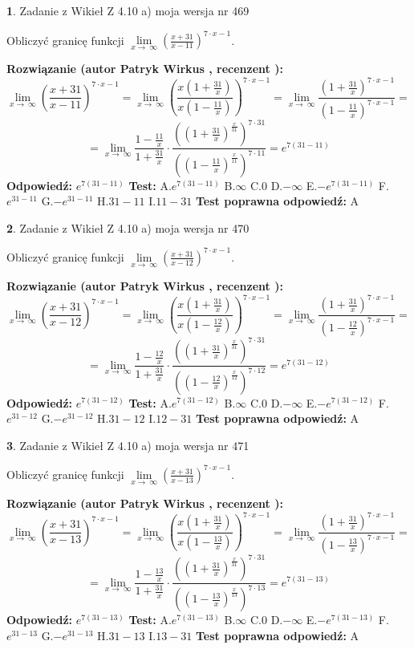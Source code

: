 \documentclass[12pt, a4paper]{article}
\theoremstyle{definition} %
\newtheorem{zad}{}
\newcommand{\zadStart}[1]{\begin{zad}#1\newline}
\newcommand{\zadStop}{\end{zad}}
\newcommand{\rozwStart}[2]{\noindent \textbf{Rozwiązanie (autor #1 , recenzent #2): }\newline}
\newcommand{\rozwStop}{\newline}
\newcommand{\odpStart}{\noindent \textbf{Odpowiedź:}\newline}
\newcommand{\odpStop}{\newline}
\newcommand{\testStart}{\noindent \textbf{Test:}\newline}
\newcommand{\testStop}{\newline}
\newcommand{\kluczStart}{\noindent \textbf{Test poprawna odpowiedź:}\newline}
\newcommand{\kluczStop}{\newline}
\begin{document}
\zadStart{Zadanie z Wikieł Z 4.10 a) moja wersja nr 469}


Obliczyć granicę funkcji  $\lim\limits_{x\to\ \infty}(\frac{x+31}{x-11})^{7\cdot x-1}$.
\zadStop
\rozwStart{Patryk Wirkus}{}
$$\lim\limits_{x\to\ \infty}(\frac{x+31}{x-11})^{7\cdot x-1} = \lim\limits_{x\to\ \infty}(\frac{x(1+\frac{31}{x})}{x(1-\frac{11}{x})})^{7\cdot x-1}=\lim\limits_{x\to\ \infty}\frac{(1+\frac{31}{x})^{7\cdot x-1}}{(1-\frac{11}{x})^{7\cdot x-1}}=$$
$$=\lim\limits_{x\to\ \infty}\frac{1-\frac{11}{x}}{1+\frac{31}{x}}\cdot\frac{((1+\frac{31}{x})^{\frac{x}{31}})^{7\cdot31}}{((1-\frac{11}{x})^{\frac{x}{11}})^{7\cdot11}}=e^{7(31-11)}$$
\rozwStop
\odpStart
$e^{7(31-11)}$
\odpStop
\testStart
A.$e^{7(31-11)}$ B.$\infty$ C.$0$ D.$-\infty$ E.$-e^{7(31-11)}$
F.$e^{31-11}$ G.$-e^{31-11}$
H.$31-11$
I.$11-31$
\testStop
\kluczStart
A
\kluczStop



\zadStart{Zadanie z Wikieł Z 4.10 a) moja wersja nr 470}


Obliczyć granicę funkcji  $\lim\limits_{x\to\ \infty}(\frac{x+31}{x-12})^{7\cdot x-1}$.
\zadStop
\rozwStart{Patryk Wirkus}{}
$$\lim\limits_{x\to\ \infty}(\frac{x+31}{x-12})^{7\cdot x-1} = \lim\limits_{x\to\ \infty}(\frac{x(1+\frac{31}{x})}{x(1-\frac{12}{x})})^{7\cdot x-1}=\lim\limits_{x\to\ \infty}\frac{(1+\frac{31}{x})^{7\cdot x-1}}{(1-\frac{12}{x})^{7\cdot x-1}}=$$
$$=\lim\limits_{x\to\ \infty}\frac{1-\frac{12}{x}}{1+\frac{31}{x}}\cdot\frac{((1+\frac{31}{x})^{\frac{x}{31}})^{7\cdot31}}{((1-\frac{12}{x})^{\frac{x}{12}})^{7\cdot12}}=e^{7(31-12)}$$
\rozwStop
\odpStart
$e^{7(31-12)}$
\odpStop
\testStart
A.$e^{7(31-12)}$ B.$\infty$ C.$0$ D.$-\infty$ E.$-e^{7(31-12)}$
F.$e^{31-12}$ G.$-e^{31-12}$
H.$31-12$
I.$12-31$
\testStop
\kluczStart
A
\kluczStop



\zadStart{Zadanie z Wikieł Z 4.10 a) moja wersja nr 471}


Obliczyć granicę funkcji  $\lim\limits_{x\to\ \infty}(\frac{x+31}{x-13})^{7\cdot x-1}$.
\zadStop
\rozwStart{Patryk Wirkus}{}
$$\lim\limits_{x\to\ \infty}(\frac{x+31}{x-13})^{7\cdot x-1} = \lim\limits_{x\to\ \infty}(\frac{x(1+\frac{31}{x})}{x(1-\frac{13}{x})})^{7\cdot x-1}=\lim\limits_{x\to\ \infty}\frac{(1+\frac{31}{x})^{7\cdot x-1}}{(1-\frac{13}{x})^{7\cdot x-1}}=$$
$$=\lim\limits_{x\to\ \infty}\frac{1-\frac{13}{x}}{1+\frac{31}{x}}\cdot\frac{((1+\frac{31}{x})^{\frac{x}{31}})^{7\cdot31}}{((1-\frac{13}{x})^{\frac{x}{13}})^{7\cdot13}}=e^{7(31-13)}$$
\rozwStop
\odpStart
$e^{7(31-13)}$
\odpStop
\testStart
A.$e^{7(31-13)}$ B.$\infty$ C.$0$ D.$-\infty$ E.$-e^{7(31-13)}$
F.$e^{31-13}$ G.$-e^{31-13}$
H.$31-13$
I.$13-31$
\testStop
\kluczStart
A
\kluczStop
\end{document}
